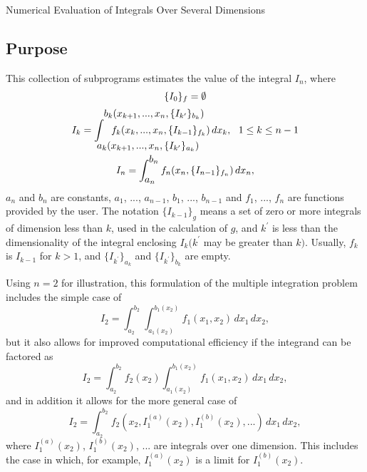 \documentclass[twoside]{MATH77}
\begin{document}
 Numerical Evaluation of Integrals Over Several Dimensions


\subsection{Purpose}

This collection of subprograms estimates the value of the integral $I_n$,
where%
\begin{gather*}
\{I_0\}_f=\emptyset \vspace{2pt} \\
I_k=\int \rule[-15pt]{0pt}{34pt}_{\displaystyle
\hspace{-9pt}a_k(x_{k+1},...,x_n,
\{I_{k^{\prime}}\}_{a_k})}^%
{\displaystyle \hspace{-2pt}b_k(x_{k+1},...,x_n,\{I_{k^{\prime}}\}_{b_k})}
\hspace{-1.3in}f_k(x_k,...,x_n,\{I_{k-1}\}_{f_k})\,dx_k,\ \
1\leq k\leq n-1\\
I_n=\int_{\displaystyle a_n}^{\displaystyle b_n}f_n(x_n,
\{I_{n-1}\}_{f_n})\,dx_n,
\end{gather*}
$a_n$ and $b_n$ are constants, $a_1$, ..., $a_{n-1}$, $b_1$, ..., $b_{n-1}$
and $f_1$, ..., $f_n$ are functions provided by the user. The notation
$\{I_{k-1}\}_g$ means a set of zero or more integrals of dimension less
than $k$, used in the calculation of $g$, and $k^{\prime }$ is less than
the dimensionality of the integral enclosing $I_k(k^{\prime }$ may be
greater than $k)$. Usually, $f_k$ is $I_{k-1}$ for $k>1$, and
$\{I_{k^{\prime}}\}_{a_k}$ and $\{I_{k^{\prime}}\}_{b_k}$ are empty.

Using $n=2$ for illustration, this formulation of the multiple integration
problem includes the simple case of%
\begin{equation*}
I_2=\int_{\displaystyle a_2}^{\displaystyle b_2}\int_{\displaystyle %
a_1(x_2)}^{\displaystyle b_1(x_2)}f_1(x_1,x_2)\,dx_1\,dx_2,
\end{equation*}
but it also allows for improved computational efficiency if the integrand
can be factored as%
\begin{equation*}
I_2=\int_{\displaystyle a_2}^{\displaystyle b_2}f_2(x_2)\int_{\displaystyle %
a_1(x_2)}^{\displaystyle b_1(x_2)}f_1(x_1,x_2)\,dx_1\,dx_2,
\end{equation*}
and in addition it allows for the more general case of%
\begin{equation*}
I_2=\int_{\displaystyle a_2}^{\displaystyle %
b_2}f_2(x_2,I_1^{(a)}(x_2),I_1^{(b)}(x_2),...)\,dx_1\,dx_2,
\end{equation*}
where $I_1^{(a)}(x_2)$, $I_1^{(b)}(x_2)$, ... are integrals over one
dimension. This includes the case in which, for example, $I_1^{(a)}(x_2)$ is
a limit for $I_1^{(b)}(x_2).$
\end{document}
